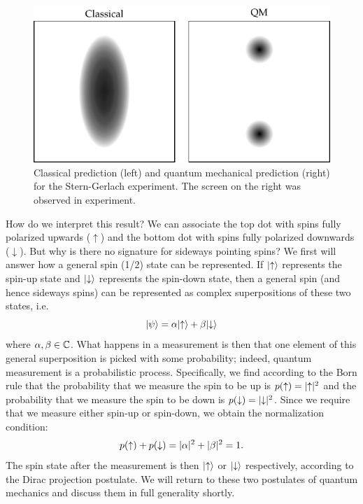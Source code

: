 \begin{figure}[htbp]
    \centering
    \includegraphics[]{Images/fig-SGexppredictions.pdf}
    \caption{Classical prediction (left) and quantum mechanical prediction (right) for the Stern-Gerlach experiment. The screen on the right was observed in experiment.}
    \label{fig-SGexppredictions}
\end{figure}

How do we interpret this result? We can associate the top dot with spins fully polarized upwards ($\uparrow$) and the bottom dot with spins fully polarized downwards ($\downarrow$). But why is there no signature for sideways pointing spins? We first will answer how a general spin (1/2) state can be represented. If $\lvert \uparrow \rangle$ represents the spin-up state and $\lvert \downarrow \rangle$ represents the spin-down state, then a general spin (and hence sideways spins) can be represented as complex superpositions of these two states, i.e.
\begin{equation}
    \lvert \psi \rangle = \alpha\lvert \uparrow \rangle + \beta\lvert \downarrow \rangle
\end{equation}
where $\alpha, \beta \in  \mathbb{C}$. What happens in a measurement is then that one element of this general superposition is picked with some probability; indeed, quantum measurement is a probabilistic process. Specifically, we find according to the Born rule that the probability that we measure the spin to be up is $p(\uparrow) = \lvert \uparrow \rvert^2$ and the probability that we measure the spin to be down is $p(\downarrow) = \lvert \downarrow \rvert^2$. Since we require that we measure either spin-up or spin-down, we obtain the normalization condition:
\begin{equation}
    p(\uparrow) + p(\downarrow) = \lvert \alpha \rvert^2 + \lvert \beta \rvert^2 = 1.
\end{equation}
The spin state after the measurement is then $\lvert \uparrow \rangle$ or $\lvert \downarrow \rangle$ respectively, according to the Dirac projection postulate. We will return to these two postulates of quantum mechanics and discuss them in full generality shortly. 

